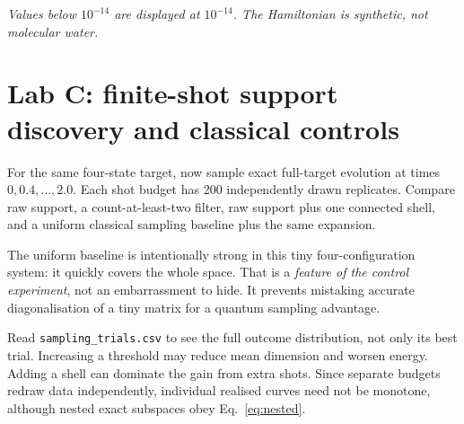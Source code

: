 \documentclass[11pt,a4paper,oneside]{report}
\begin{document}
\begin{center}
\end{center}
\textit{Values below $10^{-14}$ are displayed at $10^{-14}$. The Hamiltonian is synthetic, not molecular water.}

\section{Lab C: finite-shot support discovery and classical controls}
For the same four-state target, now sample exact full-target evolution at times $0,0.4,\ldots,2.0$. Each shot budget has 200 independently drawn replicates. Compare raw support, a count-at-least-two filter, raw support plus one connected shell, and a uniform classical sampling baseline plus the same expansion.

The uniform baseline is intentionally strong in this tiny four-configuration system: it quickly covers the whole space. That is a \emph{feature of the control experiment}, not an embarrassment to hide. It prevents mistaking accurate diagonalisation of a tiny matrix for a quantum sampling advantage.

Read \texttt{sampling\_trials.csv} to see the full outcome distribution, not only its best trial. Increasing a threshold may reduce mean dimension and worsen energy. Adding a shell can dominate the gain from extra shots. Since separate budgets redraw data independently, individual realised curves need not be monotone, although nested exact subspaces obey Eq.~\eqref{eq:nested}.
\end{document}
